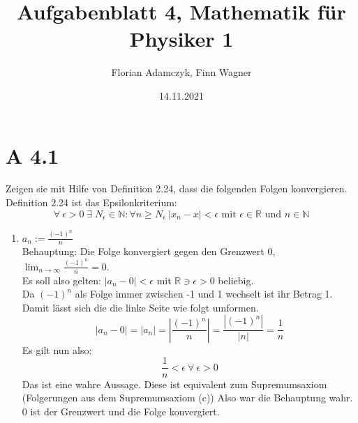 \documentclass{article}
\date{14.11.2021}
\title{Aufgabenblatt 4, Mathematik für Physiker 1}
\author{Florian Adamczyk, Finn Wagner}
\begin{document}
    \maketitle

    \section*{A 4.1}
    Zeigen sie mit Hilfe von Definition 2.24, dass die folgenden Folgen konvergieren.
    Definition 2.24 ist das Epsilonkriterium:
    \[\forall \: \epsilon > 0 \; \exists \; N_{\epsilon} \in \mathbb{N} : \forall n \geq N_{\epsilon} \: |x_n - x| < \epsilon
        \text{ mit } \epsilon \in \mathbb{R} \text{ und } n \in \mathbb{N}\]

    \begin{enumerate}[ label= (\roman*) ]
        \item \(a_n := \frac{ {(-1)}^n }{ n } \) \\
        Behauptung: Die Folge konvergiert gegen den Grenzwert 0, \(\lim_{n \to \infty } \frac{ {(-1)}^n }{ n } = 0 \). \\
        Es soll also gelten: \( |a_n - 0| < \epsilon \) mit \( \mathbb{R} \ni \epsilon > 0\) beliebig. \\
        Da \( { (-1) }^n \) als Folge immer zwischen -1 und 1 wechselt ist ihr Betrag 1. Damit lässt sich die die linke Seite wie folgt umformen.
        \[|a_n - 0| = |a_n| = | \frac{ {(-1)}^n }{ n } | = \frac{ |{(-1)}^n| }{ |n| } = \frac{ 1 }{ n } \]
        Es gilt nun also:
        \[ \frac{ 1 }{ n } < \epsilon \: \forall \: \epsilon > 0 \]
        Das ist eine wahre Aussage. Diese ist equivalent zum Supremumsaxiom (Folgerungen aus dem Supremumsaxiom (c))
        Also war die Behauptung wahr. 0 ist der Grenzwert und die Folge konvergiert.


\end{enumerate}
\end{document}
